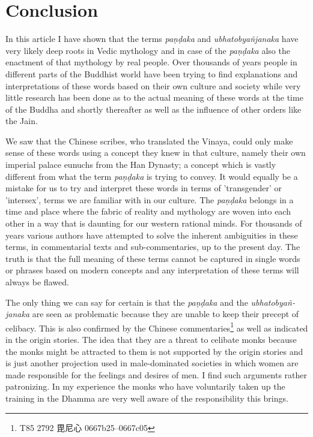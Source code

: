 \section{Conclusion}
In this article I have shown that the terms {\em paṇḍaka} and {\em ubhatob­yañ­janaka} have very likely deep roots in Vedic mythology and in case of the {\em paṇḍaka} also the enactment of that mythology by real people. Over thousands of years people in different parts of the Buddhist world have been trying to find explanations and interpretations of these words based on their own culture and society while very little research has been done as to the actual meaning of these words at the time of the Buddha and shortly thereafter as well as the influence of other orders like the Jain. 

We saw that the Chinese scribes, who translated the Vinaya, could only make sense of these words using a concept they knew in that culture, namely their own imperial palace eunuchs from the Han Dynasty; a concept which is vastly different from what the term {\em paṇḍaka} is trying to convey. It would equally be a mistake for us to try and interpret these words in terms of 'transgender' or 'intersex', terms we are familiar with in our culture. The {\em paṇḍaka} belongs in a time and place where the fabric of reality and mythology are woven into each other in a way that is daunting for our western rational minds. For thousands of years various authors have attempted to solve the inherent ambiguities in these terms, in commentarial texts and sub-commentaries, up to the present day. The truth is that the full meaning of these terms cannot be captured in single words or phrases based on modern concepts and any interpretation of these terms will always be flawed.

The only thing we can say for certain is that the {\em paṇḍaka} and the {\em ubhatob­yañ­janaka} are seen as problematic because they are unable to keep their precept of celibacy. This is also confirmed by the Chinese commentaries\footnote{T85 2792 毘尼心 0667b25–0667c05} as well as indicated in the origin stories. The idea that they are a threat to celibate monks because the monks might be attracted to them is not supported by the origin stories and is just another projection used in male-dominated societies in which women are made responsible for the feelings and desires of men. I find such arguments rather patronizing. In my experience the monks who have voluntarily taken up the training in the Dhamma are very well aware of the responsibility this brings.

